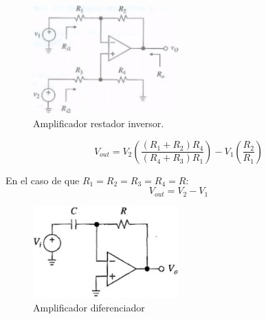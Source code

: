 \documentclass[12pt, letterpaper]{extarticle}
\begin{document}


\newpage

\tableofcontents

\newpage



\begin{figure}[h]
    \centering
    \includegraphics[width=0.5\textwidth]{Media/amplificador_restador_inverso.png}
    \caption{Amplificador restador inversor.}
    \label{Fig: Amplificador restador inversor}
\end{figure}

\begin{equation*}
    V_{out} = V_{2}\left(\frac{(R_{1}+R_{2})R_{4}}{(R_{4}+R_{3})R_{1}}\right)
             -V_{1}\left(\frac{R_{2}}{R_{1}}\right)
\end{equation*}

En el caso de que $R_{1}=R_{2}=R_{3}=R_{4}=R$:
\begin{equation*}
    V_{out} = V_{2} - V_{1}
\end{equation*}


\begin{figure}[h]
    \centering
    \includegraphics[width=0.5\textwidth]{Media/amplificador_diferenciador.png}
    \caption{Amplificador diferenciador}
    \label{Fig: Amplificador diferenciador}
\end{figure}
\end{document}
